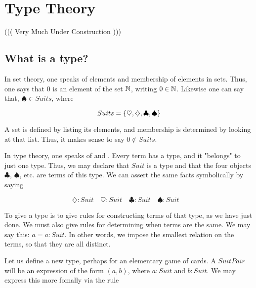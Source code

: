 

\begin{mathmacro}
\newcommand{\set}[1]{\{ #1 \}}
\newcommand{\nat}[0]{\mathbb{N}}
\end{mathmacro}

\section{Type Theory}

((( Very Much Under Construction )))

\innertableofcontents

\subsection{What is a type?}



In set theory, one speaks of elements and membership of elements in sets.  Thus, one says that $0$ is an element of the set $\nat$, writing $0 \in \nat$.  Likewise one can say that, $\spadesuit \in Suits$, where

$$ Suits = \set{\heartsuit, \diamondsuit, \clubsuit, \spadesuit }$$

A set is defined by listing its elements, and membership is determined by looking at that list.  Thus, it makes sense to say $0 \not\in Suits$.

In type theory, one speaks of  and .  Every term has a type, and it "belongs" to just one type.  Thus, we may declare that $Suit$ is a type and that the four objects $\clubsuit$, $\spadesuit$, etc. are terms of this type.  We can assert the same facts symbolically by saying

$$
\diamondsuit : Suit \quad
\heartsuit : Suit \quad
\clubsuit : Suit \quad
\spadesuit : Suit \quad
$$

To give a type is to give rules for constructing terms of that type, as we have just done.  We must also give rules for determining when terms are the same.  We may say this:  $a = a : Suit$.  In other words, we impose the smallest relation on the terms, so that they are all distinct.

Let us define a new type, perhaps for an elementary game of cards.  A $SuitPair$ will be an expression of the form $(a,b)$, where $a : Suit$ and $b : Suit$.  We may express this more fomally via the rule

